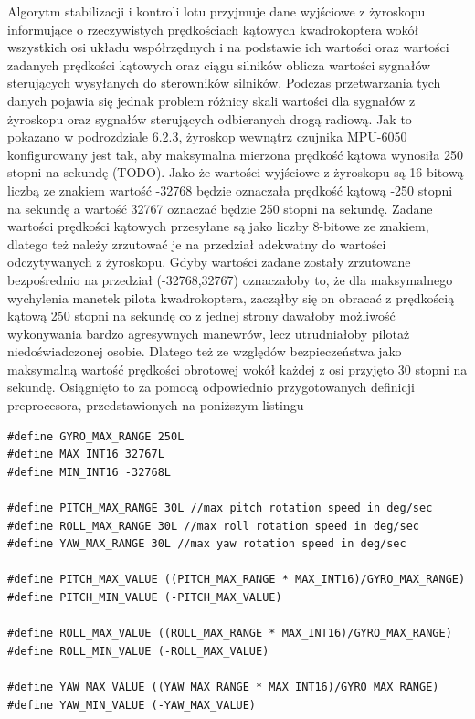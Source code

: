 Algorytm stabilizacji i kontroli lotu przyjmuje dane wyjściowe z żyroskopu informujące o rzeczywistych prędkościach kątowych kwadrokoptera wokół wszystkich osi układu współrzędnych i na podstawie ich wartości oraz wartości zadanych prędkości kątowych oraz ciągu silników oblicza wartości sygnałów sterujących wysyłanych do sterowników silników. Podczas przetwarzania tych danych pojawia się jednak problem różnicy skali wartości dla sygnałów z żyroskopu oraz sygnałów sterujących odbieranych drogą radiową. Jak to pokazano w  podrozdziale 6.2.3, żyroskop wewnątrz czujnika MPU-6050 konfigurowany jest tak, aby maksymalna mierzona prędkość kątowa wynosiła 250 stopni na sekundę (TODO). Jako że wartości wyjściowe z żyroskopu są 16-bitową liczbą ze znakiem wartość -32768 będzie oznaczała prędkość kątową -250 stopni na sekundę a wartość 32767 oznaczać będzie 250 stopni na sekundę. Zadane wartości prędkości kątowych przesyłane są jako liczby 8-bitowe ze znakiem, dlatego też należy zrzutować je na przedział adekwatny do wartości odczytywanych z żyroskopu. Gdyby wartości zadane zostały zrzutowane bezpośrednio na przedział (-32768,32767) oznaczałoby to, że dla maksymalnego wychylenia manetek pilota kwadrokoptera, zacząłby się on obracać z prędkością kątową 250 stopni na sekundę co z jednej strony dawałoby możliwość wykonywania bardzo agresywnych manewrów, lecz utrudniałoby pilotaż niedoświadczonej osobie. Dlatego też ze względów bezpieczeństwa jako maksymalną wartość prędkości obrotowej wokół każdej z osi przyjęto 30 stopni na sekundę. Osiągnięto to za pomocą odpowiednio przygotowanych definicji preprocesora, przedstawionych na poniższym listingu

\begin{lstlisting}
#define GYRO_MAX_RANGE 250L
#define MAX_INT16 32767L
#define MIN_INT16 -32768L

#define PITCH_MAX_RANGE 30L //max pitch rotation speed in deg/sec
#define ROLL_MAX_RANGE 30L //max roll rotation speed in deg/sec
#define YAW_MAX_RANGE 30L //max yaw rotation speed in deg/sec

#define PITCH_MAX_VALUE ((PITCH_MAX_RANGE * MAX_INT16)/GYRO_MAX_RANGE)
#define PITCH_MIN_VALUE (-PITCH_MAX_VALUE)

#define ROLL_MAX_VALUE ((ROLL_MAX_RANGE * MAX_INT16)/GYRO_MAX_RANGE)
#define ROLL_MIN_VALUE (-ROLL_MAX_VALUE)

#define YAW_MAX_VALUE ((YAW_MAX_RANGE * MAX_INT16)/GYRO_MAX_RANGE)
#define YAW_MIN_VALUE (-YAW_MAX_VALUE)
\end{lstlisting}

